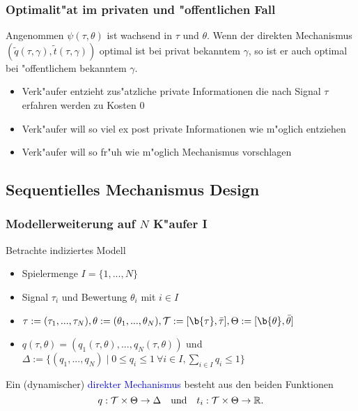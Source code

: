 \begin{frame}
\frametitle{Optimalit"at im privaten und "offentlichen Fall}
\justifying
\begin{thmP}
  Angenommen $\psi(\tau, \theta)$ ist wachsend in $\tau$ und $\theta$. Wenn der direkten Mechanismus $(\tilde{q}(\tau, \gamma), \tilde{t}(\tau, \gamma))$ optimal ist bei privat bekanntem $\gamma$, so ist er
  auch optimal bei "offentlichem bekanntem $\gamma$.
\end{thmP}
\begin{itemize}
  \item Verk"aufer entzieht zus"atzliche private Informationen die nach Signal $\tau$ erfahren werden zu Kosten $0$
  \item Verk"aufer will so viel ex post private Informationen wie m"oglich entziehen
  \item Verk"aufer will so fr"uh wie m"oglich Mechanismus vorschlagen
\end{itemize}
\end{frame}

\subsection{Sequentielles Mechanismus Design}
\begin{frame}
\frametitle{Modellerweiterung auf $N$ K"aufer I}
\justifying
Betrachte indiziertes Modell
\begin{itemize}
  \item Spielermenge $I = \{ 1,...,N \}$
  \item Signal $\tau_{i}$ und Bewertung $\theta_{i}$ mit $i \in I$
  \item $\tau:= (\tau_{1}, ...,\tau_{N}), \theta := (\theta_{1}, ...,\theta_{N}), \Tau := [\b{\tau}, \bar{\tau}], \Theta := [\b{\theta}, \bar{\theta}]$
  \item $q(\tau, \theta) = (q_{1}(\tau, \theta), ...,q_{N}(\tau, \theta))$ und $\Delta := \{ (q_{1},...,q_{N}) \mid 0 \leq q_{i} \leq 1 \ \forall i \in I, \sum_{i \in I} q_{i} \leq 1 \}$
\end{itemize}
\begin{thmD}
  Ein (dynamischer) \textcolor{blue}{direkter Mechanismus} besteht aus den beiden Funktionen
  \begin{equation*}
    q: \mathcal{T} \times \Theta \rightarrow \Delta
    \quad \text{und} \quad
    t_{i}:\mathcal{T} \times \Theta \rightarrow \mathbb{R}.
  \end{equation*}
\end{thmD}
\end{frame}

